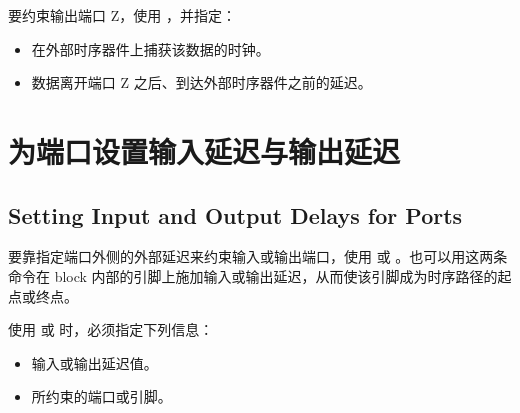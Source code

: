要约束输出端口 Z，使用 ，并指定：
\begin{itemize}
  \item 在外部时序器件上捕获该数据的时钟。
  \item 数据离开端口 Z 之后、到达外部时序器件之前的延迟。
\end{itemize}

\section{为端口设置输入延迟与输出延迟}
\subsection*{Setting Input and Output Delays for Ports}

要靠指定端口外侧的外部延迟来约束输入或输出端口，使用  或 。也可以用这两条命令在 block 内部的引脚上施加输入或输出延迟，从而使该引脚成为时序路径的起点或终点。

使用  或  时，必须指定下列信息：
\begin{itemize}
  \item 输入或输出延迟值。
  \item 所约束的端口或引脚。
\end{itemize}

